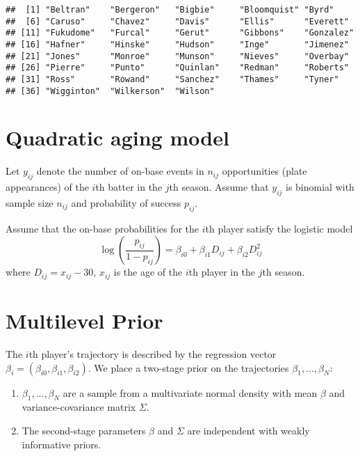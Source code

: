 \documentclass[
]{book}
\begin{document}
\begin{verbatim}
##  [1] "Beltran"    "Bergeron"   "Bigbie"     "Bloomquist" "Byrd"      
##  [6] "Caruso"     "Chavez"     "Davis"      "Ellis"      "Everett"   
## [11] "Fukudome"   "Furcal"     "Gerut"      "Gibbons"    "Gonzalez"  
## [16] "Hafner"     "Hinske"     "Hudson"     "Inge"       "Jimenez"   
## [21] "Jones"      "Monroe"     "Munson"     "Nieves"     "Overbay"   
## [26] "Pierre"     "Punto"      "Quinlan"    "Redman"     "Roberts"   
## [31] "Ross"       "Rowand"     "Sanchez"    "Thames"     "Tyner"     
## [36] "Wigginton"  "Wilkerson"  "Wilson"
\end{verbatim}

\hypertarget{quadratic-aging-model}{%
\section{Quadratic aging model}\label{quadratic-aging-model}}

Let \(y_{ij}\) denote the number of on-base events in \(n_{ij}\) opportunities (plate appearances) of the \(i\)th batter in the \(j\)th season. Assume that \(y_{ij}\) is binomial with sample size \(n_{ij}\) and probability of success \(p_{ij}\).

Assume that the on-base probabilities for the \(i\)th player satisfy the logistic model
\[
\log \left(\frac{p_{ij}}{1 - p_{ij}}\right) = \beta_{i0} + \beta_{i1} D_{ij} + \beta_{i2} D_{ij}^2
\]
where \(D_{ij} = x_{ij} - 30\), \(x_{ij}\) is the age of the \(i\)th player in the \(j\)th season.

\hypertarget{multilevel-prior}{%
\section{Multilevel Prior}\label{multilevel-prior}}

The \(i\)th player's trajectory is described by the regression vector \(\beta_i = (\beta_{i0}, \beta_{i1}, \beta_{i2})\). We place a two-stage prior on the trajectories \(\beta_1, ..., \beta_N\):

\begin{enumerate}
\def\labelenumi{\arabic{enumi}.}
\item
  \(\beta_1, ..., \beta_N\) are a sample from a multivariate normal density with mean \(\beta\) and variance-covariance matrix \(\Sigma\).
\item
  The second-stage parameters \(\beta\) and \(\Sigma\) are independent with weakly informative priors.
\end{enumerate}
\end{document}
